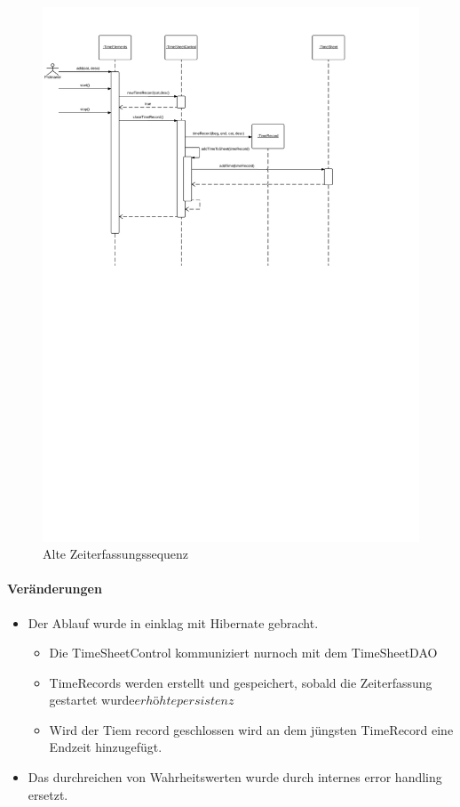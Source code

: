     \begin{figure}
      \centering
        \includegraphics[width=\linewidth]{new-Time-record.pdf}
       \caption{Alte Zeiterfassungssequenz}
    \end{figure}

    \paragraph{Veränderungen}
    \begin{itemize}
        \item Der Ablauf wurde in einklag mit Hibernate gebracht.
        \begin{itemize}
            \item Die TimeSheetControl kommuniziert nurnoch mit dem TimeSheetDAO
            \item TimeRecords werden erstellt und gespeichert, sobald die Zeiterfassung gestartet wurde\(erhöhte persistenz\)
            \item Wird der Tiem record geschlossen wird an dem jüngsten TimeRecord eine Endzeit hinzugefügt.
        \end{itemize}
        \item Das durchreichen von Wahrheitswerten wurde durch internes error handling ersetzt.
    \end{itemize}

